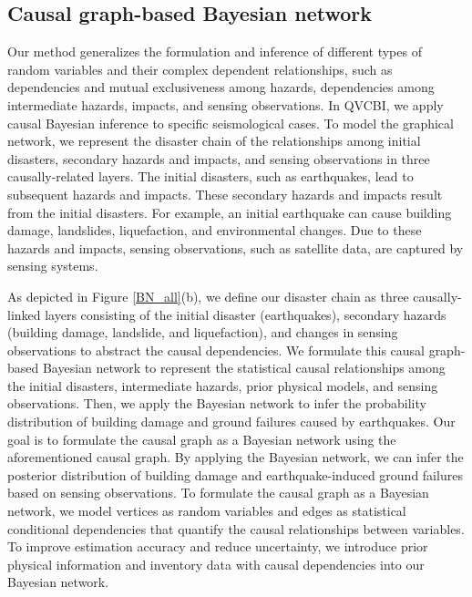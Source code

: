 \documentclass[review]{elsarticle}
\begin{document}
\subsection{Causal graph-based Bayesian network}
Our method generalizes the formulation and inference of different types of random variables and their complex dependent relationships, such as dependencies and mutual exclusiveness among hazards, dependencies among intermediate hazards, impacts, and sensing observations. In QVCBI, we apply causal Bayesian inference to specific seismological cases. To model the graphical network, we represent the disaster chain of the relationships among initial disasters, secondary hazards and impacts, and sensing observations in three causally-related layers. The initial disasters, such as earthquakes, lead to subsequent hazards and impacts. These secondary hazards and impacts result from the initial disasters. For example, an initial earthquake can cause building damage, landslides, liquefaction, and environmental changes. Due to these hazards and impacts, sensing observations, such as satellite data, are captured by sensing systems.

As depicted in Figure \ref{BN_all}(b), we define our disaster chain as three causally-linked layers consisting of the initial disaster (earthquakes), secondary hazards (building damage, landslide, and liquefaction), and changes in sensing observations to abstract the causal dependencies. We formulate this causal graph-based Bayesian network to represent the statistical causal relationships among the initial disasters, intermediate hazards, prior physical models, and sensing observations. Then, we apply the Bayesian network to infer the probability distribution of building damage and ground failures caused by earthquakes. Our goal is to formulate the causal graph as a Bayesian network using the aforementioned causal graph. By applying the Bayesian network, we can infer the posterior distribution of building damage and earthquake-induced ground failures based on sensing observations. To formulate the causal graph as a Bayesian network, we model vertices as random variables and edges as statistical conditional dependencies that quantify the causal relationships between variables. To improve estimation accuracy and reduce uncertainty, we introduce prior physical information and inventory data with causal dependencies into our Bayesian network.
\end{document}

